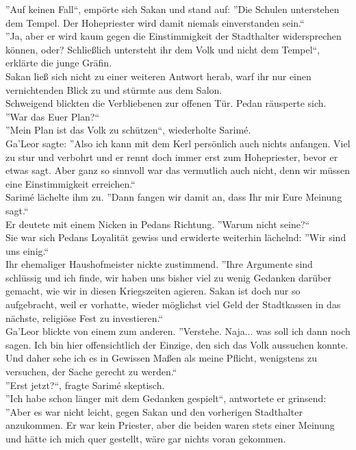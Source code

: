 ''Auf keinen Fall``, empörte sich Sakan und stand auf: ''Die Schulen unterstehen dem Tempel. Der 
Hohepriester wird damit niemals einverstanden sein.``\\
''Ja, aber er wird kaum gegen die Einstimmigkeit der Stadthalter widersprechen können, oder? 
Schließlich untersteht ihr dem Volk und nicht dem Tempel``, erklärte die junge Gräfin.\\
Sakan ließ sich nicht zu einer weiteren Antwort herab, warf ihr nur einen vernichtenden Blick zu 
und stürmte aus dem Salon.\\
Schweigend blickten die Verbliebenen zur offenen Tür. Pedan räusperte sich. ''War das Euer Plan?``\\
''Mein Plan ist das Volk zu schützen``, wiederholte Sarimé.\\
Ga'Leor sagte: ''Also ich kann mit dem Kerl persönlich auch nichts anfangen. Viel zu stur und 
verbohrt und er rennt doch immer erst zum Hohepriester, bevor er etwas sagt. Aber ganz so sinnvoll 
war das vermutlich auch nicht, denn wir müssen eine Einstimmigkeit erreichen.``\\
Sarimé lächelte ihm zu. ''Dann fangen wir damit an, dass Ihr mir Eure Meinung sagt.``\\
Er deutete mit einem Nicken in Pedans Richtung. ''Warum nicht seine?``\\
Sie war sich Pedans Loyalität gewiss und erwiderte weiterhin lächelnd: ''Wir sind uns einig.``\\
Ihr ehemaliger Haushofmeister nickte zustimmend. ''Ihre Argumente sind schlüssig und ich finde, wir 
haben uns bisher viel zu wenig Gedanken darüber gemacht, wie wir in diesen Kriegszeiten agieren. 
Sakan ist doch nur so aufgebracht, weil er vorhatte, wieder möglichst viel Geld der Stadtkassen in 
das nächste, religiöse Fest zu investieren.``\\
Ga'Leor blickte von einem zum anderen. ''Verstehe. Naja... was soll ich dann noch sagen. Ich bin 
hier offensichtlich der Einzige, den sich das Volk aussuchen konnte. Und daher sehe ich es in 
Gewissen Maßen als meine Pflicht, wenigstens zu versuchen, der Sache gerecht zu werden.``\\
''Erst jetzt?``, fragte Sarimé skeptisch.\\
''Ich habe schon länger mit dem Gedanken gespielt``, antwortete er grinsend: ''Aber es war nicht 
leicht, gegen Sakan und den vorherigen Stadthalter anzukommen. Er war kein Priester, aber die 
beiden waren stets einer Meinung und hätte ich mich quer gestellt, wäre gar nichts voran gekommen. 

